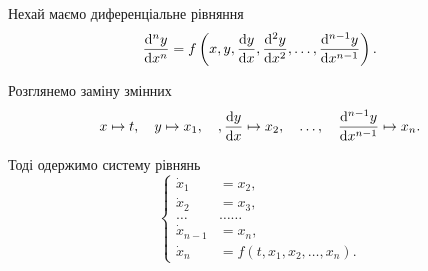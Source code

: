 Нехай маємо диференціальне рівняння
\begin{equation*}
 	\frac{\diff^n y}{\diff x^n} = f \left( x, y, \frac{\diff y}{\diff x}, \frac{\diff^2 y}{\diff x^2}, \ldots, \frac{\diff^{n - 1} y}{\diff x^{n - 1}} \right).
\end{equation*}

Розглянемо заміну змінних
\begin{equation*}
	x \mapsto t, \quad y \mapsto x_1, \quad, \frac{\mathop{}\!\mathrm{d} y}{\mathop{}\!\mathrm{d} x} \mapsto x_2, \quad \ldots, \quad \frac{\mathop{}\!\mathrm{d}^{n - 1} y}{\mathop{}\!\mathrm{d} x^{n - 1}} \mapsto x_n.
\end{equation*}

Тоді одержимо систему рівнянь
\begin{equation*}
	\left\{
		\begin{aligned}
			\dot x_1 &= x_2, \\
			\dot x_2 &= x_3, \\
			\ldots & \ldots \ldots \\
			\dot x_{n - 1} &= x_n, \\
			\dot x_n &= f(t, x_1, x_2, \ldots, x_n).
		\end{aligned}
	\right.
\end{equation*}